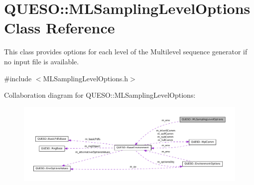 \hypertarget{class_q_u_e_s_o_1_1_m_l_sampling_level_options}{\section{Q\-U\-E\-S\-O\-:\-:M\-L\-Sampling\-Level\-Options Class Reference}
\label{class_q_u_e_s_o_1_1_m_l_sampling_level_options}
}


This class provides options for each level of the Multilevel sequence generator if no input file is available.  




{\ttfamily \#include $<$M\-L\-Sampling\-Level\-Options.\-h$>$}



Collaboration diagram for Q\-U\-E\-S\-O\-:\-:M\-L\-Sampling\-Level\-Options\-:
\nopagebreak
\begin{figure}[H]
\begin{center}
\leavevmode
\includegraphics[width=350pt]{class_q_u_e_s_o_1_1_m_l_sampling_level_options__coll__graph}
\end{center}
\end{figure}

